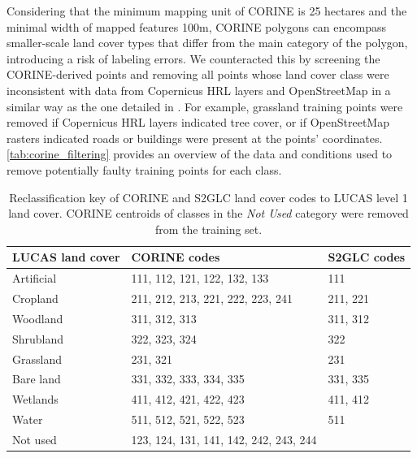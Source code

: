         Considering that the minimum mapping unit of CORINE is 25 hectares and the minimal width of mapped features 100m, CORINE polygons can encompass smaller-scale land cover types that differ from the main category of the polygon, introducing a risk of labeling errors. We counteracted this by screening the CORINE-derived points and removing all points whose land cover class were inconsistent with data from Copernicus HRL layers and OpenStreetMap in a similar way as the one detailed in \citet{witjes2022spatiotemporal}. For example, grassland training points were removed if Copernicus HRL layers indicated tree cover, or if OpenStreetMap rasters indicated roads or buildings were present at the points' coordinates. \ref{tab:corine_filtering} provides an overview of the data and conditions used to remove potentially faulty training points for each class.
    
        \begin{table}[H]
        \centering
        \caption{Reclassification key of CORINE and S2GLC land cover codes to LUCAS level 1 land cover. CORINE centroids of classes in the \textit{Not Used} category were removed from the training set.}
        \label{tab:clc3_to_lucas1}
        \begin{tabular}{lll}
        \hline
        LUCAS land cover & CORINE codes                             & S2GLC codes  \\ 
        \hline
        Artificial       & 111, 112, 121, 122, 132, 133             & 111          \\
        Cropland         & 211, 212, 213, 221, 222, 223, 241        & 211, 221     \\
        Woodland         & 311, 312, 313                            & 311, 312     \\
        Shrubland        & 322, 323, 324                            & 322          \\
        Grassland        & 231, 321                                 & 231          \\
        Bare land        & 331, 332, 333, 334, 335                  & 331, 335     \\
        Wetlands         & 411, 412, 421, 422, 423                  & 411, 412     \\
        Water            & 511, 512, 521, 522, 523                  & 511          \\ 
        \hline
        Not used         & 123, 124, 131, 141, 142, 242, 243, 244   &          \\
        \hline
        \end{tabular}
        \end{table} 


